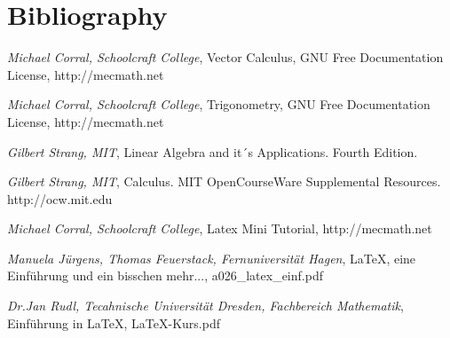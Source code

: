 \documentclass[a4paper]{article}
\begin{document}
\section{Bibliography}
\begin{thebibliography}    

     \textit{Michael Corral, Schoolcraft College},
	    Vector Calculus, GNU Free Documentation License, http://mecmath.net 
	    
     \textit{Michael Corral, Schoolcraft College},
	    Trigonometry, GNU Free Documentation License, http://mecmath.net         
	    
     \textit{Gilbert Strang, MIT},
	    Linear Algebra and it´s Applications. Fourth Edition.
	    
     \textit{Gilbert Strang, MIT},
            Calculus. MIT OpenCourseWare Supplemental Resources. http://ocw.mit.edu    
            
     \textit{Michael Corral, Schoolcraft College},
            Latex Mini Tutorial, http://mecmath.net            
            
     \textit{Manuela J\"urgens, Thomas Feuerstack, Fernuniversit\"at Hagen},
            LaTeX, eine Einf\"uhrung und ein bisschen mehr..., a026\_latex\_einf.pdf
            
     \textit{Dr.Jan Rudl, Tecahnische Universit\"at Dresden, Fachbereich Mathematik},
            Einf\"uhrung in LaTeX, LaTeX-Kurs.pdf            

\end{thebibliography}



\printindex
\end{document}
